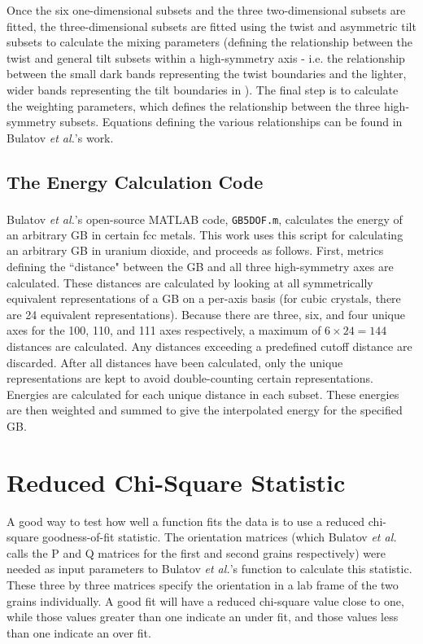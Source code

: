 \documentclass[12pt]{report}
\begin{document}
Once the six one-dimensional subsets and the three two-dimensional subsets are fitted, the three-dimensional subsets are fitted using the twist and asymmetric tilt subsets to calculate the mixing parameters (defining the relationship between the twist and general tilt subsets within a high-symmetry axis - i.e. the relationship between the small dark bands representing the twist boundaries and the lighter, wider bands representing the tilt boundaries in ).  The final step is to calculate the weighting parameters, which defines the relationship between the three high-symmetry subsets.  Equations defining the various relationships can be found in Bulatov \emph{et al.}'s work.

\subsection{The Energy Calculation Code\label{code:energyCalc}}
Bulatov \emph{et al.}'s open-source MATLAB\textsuperscript{\textregistered} code\cite{bulatov2014}, \lstinline!GB5DOF.m!, calculates the energy of an arbitrary GB in certain fcc metals. This work uses this script for calculating an arbitrary GB in uranium dioxide, and proceeds as follows.  First, metrics defining the ``distance" between the GB and all three high-symmetry axes are calculated.  These distances are calculated by looking at all symmetrically equivalent representations of a GB on a per-axis basis (for cubic crystals, there are 24 equivalent representations\cite{stokes2007}).  Because there are three, six, and four unique axes for the \textlangle{}100\textrangle{}, \textlangle{}110\textrangle{}, and \textlangle{}111\textrangle{} axes respectively, a maximum of $6\times24=144$ distances are calculated.  Any distances exceeding a predefined cutoff distance are discarded.  After all distances have been calculated, only the unique representations are kept to avoid double-counting certain representations.\cite{bulatov2014}  Energies are calculated for each unique distance in each subset.  These energies are then weighted and summed to give the interpolated energy for the specified GB.

\section{Reduced Chi-Square Statistic\label{methods:chi2}}
A good way to test how well a function fits the data is to use a reduced chi-square goodness-of-fit statistic.\cite{bevington2003}  The orientation matrices (which Bulatov \emph{et al.} calls the P and Q matrices for the first and second grains respectively) were needed as input parameters to Bulatov \emph{et al.}'s function to calculate this statistic.  These three by three matrices specify the orientation in a lab frame of the two grains individually. A good fit will have a reduced chi-square value close to one, while those values greater than one indicate an under fit, and those values less than one indicate an over fit.\cite{bevington2003}
\end{document}
